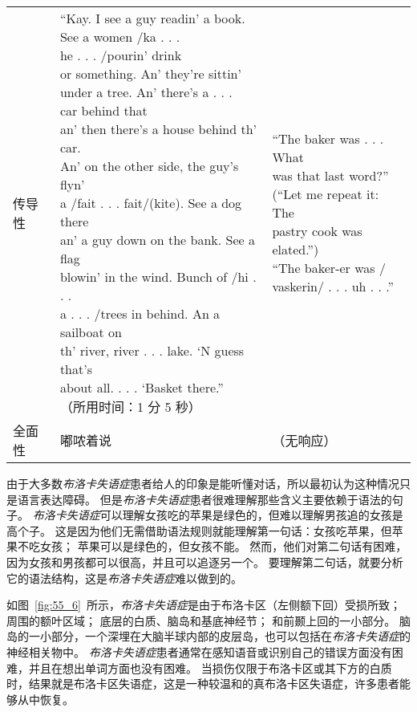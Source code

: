 \begin{table}[htbp]
\begin{tabular}{lll}
		传导性 & \makecell[l]{“Kay. I see a guy readin’ a book. \\See a women /ka . . . \\he . . . /pourin’ drink \\ or something. An’ they’re sittin’ \\under a tree. An’ there’s a . . . \\car behind that \\ an’ then there’s a house behind th’ car. \\An’ on the other side, the guy’s flyn’ \\ a /fait . . . fait/(kite). See a dog there \\an’ a guy down on the bank. See a flag \\ blowin’ in the wind. Bunch of /hi . . . \\a . . . /trees in behind. An a sailboat on \\ th’ river, river . . . lake. ‘N guess that’s \\about all. . . . ‘Basket there.” \\（所用时间：1 分 5 秒）} & \makecell{“The baker was . . . What \\ was that last word?” \\ (“Let me repeat it: The \\ pastry cook was elated.”) \\ 	“The baker-er was / \\ vaskerin/ . . . uh . . .”} \\
		全面性 & 嘟哝着说 & （无响应） \\
		\bottomrule
	\end{tabular}
\end{table}


由于大多数\textit{布洛卡失语症}患者给人的印象是能听懂对话，所以最初认为这种情况只是语言表达障碍。
但是\textit{布洛卡失语症}患者很难理解那些含义主要依赖于语法的句子。
\textit{布洛卡失语症}可以理解女孩吃的苹果是绿色的，但难以理解男孩追的女孩是高个子。
这是因为他们无需借助语法规则就能理解第一句话：女孩吃苹果，但苹果不吃女孩；
苹果可以是绿色的，但女孩不能。
然而，他们对第二句话有困难，因为女孩和男孩都可以很高，并且可以追逐另一个。
要理解第二句话，就要分析它的语法结构，这是\textit{布洛卡失语症}难以做到的。


如图~\ref{fig:55_6}~所示，\textit{布洛卡失语症}是由于布洛卡区（左侧额下回）受损所致；
周围的额叶区域；
底层的白质、脑岛和基底神经节；
和前颞上回的一小部分。
脑岛的一小部分，一个深埋在大脑半球内部的皮层岛，也可以包括在\textit{布洛卡失语症}的神经相关物中。
\textit{布洛卡失语症}患者通常在感知语音或识别自己的错误方面没有困难，并且在想出单词方面也没有困难。
当损伤仅限于布洛卡区或其下方的白质时，结果就是布洛卡区失语症，这是一种较温和的真布洛卡区失语症，许多患者能够从中恢复。


